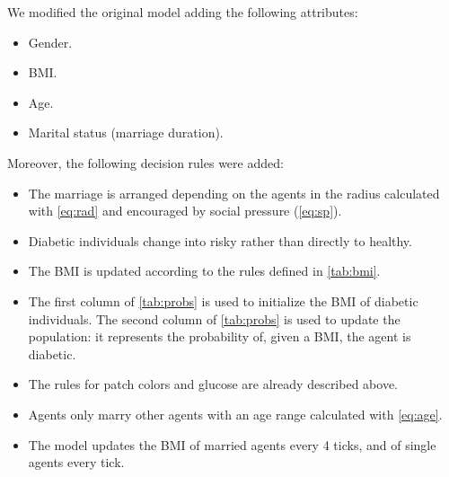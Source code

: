 We modified the original model adding the following attributes:
\begin{itemize}
\item Gender.
\item BMI.
\item Age.
\item Marital status (marriage duration).
\end{itemize}
Moreover, the following decision rules were added:
\begin{itemize}
\item  The marriage is arranged depending on the agents in the radius calculated with \cref{eq:rad} and encouraged by social pressure (\cref{eq:sp}). 
\item Diabetic individuals change into risky rather than directly to healthy.
\item The BMI is updated according to the rules defined in \cref{tab:bmi}.
\item  The first column of \cref{tab:probs} is used to initialize the BMI of diabetic individuals. The second column of \cref{tab:probs} is used to update the population: it represents the probability of, given a BMI, the agent is diabetic.
\item The rules for patch colors and glucose are already described above.
\item Agents only marry other agents with an age range calculated with \cref{eq:age}.
\item The model updates the BMI of married agents every 4 ticks, and of single agents every tick.
\end{itemize}